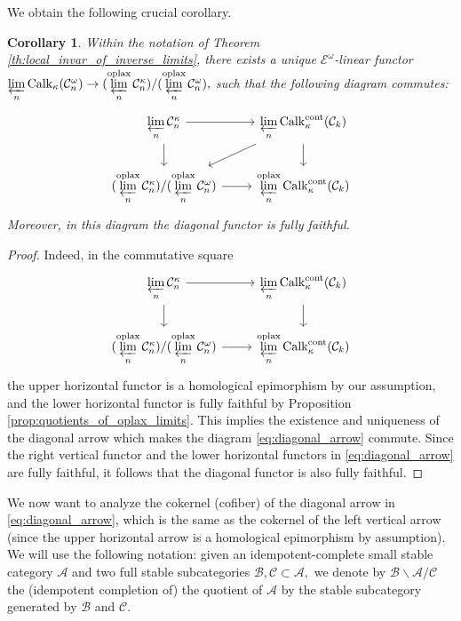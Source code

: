 \documentclass[11pt,leqno]{amsart}
\newtheorem{cor}[theo]{Corollary}
\numberwithin{equation}{section}
\newcommand{\prolim}[1][]{\mathop{\varprojlim}\limits_{#1}}
\newcommand{\oplax}{\operatorname{oplax}}
\newcommand{\cont}{\operatorname{cont}}
\newcommand{\cA}{{\mathcal A}}
\newcommand{\cB}{{\mathcal B}}
\newcommand{\cC}{{\mathcal C}}
\newcommand{\cE}{{\mathcal E}}
\newcommand{\Calk}{\operatorname{Calk}}
\begin{document}
We obtain the following crucial corollary.

\begin{cor}\label{cor:diagonal_arrow}
Within the notation of Theorem \ref{th:local_invar_of_inverse_limits}, there exists a unique $\cE^{\omega}$-linear functor $\prolim[n]\Calk_{\kappa}(\cC_n^{\omega})\to (\prolim[n]^{\oplax}\cC_n^{\kappa})/(\prolim[n]^{\oplax}\cC_n^{\omega}),$ such that the following diagram commutes:
\begin{equation}\label{eq:diagonal_arrow}
\begin{tikzcd}
\prolim[n]\cC_n^{\kappa} \ar[r]\ar[d]  & \prolim[n]\Calk_{\kappa}^{\cont}(\cC_k) \ar[d]\ar[ld] \\
(\prolim[n]^{\oplax}\cC_n^{\kappa})/(\prolim[n]^{\oplax}\cC_n^{\omega})\ar[r] & \prolim[n]^{\oplax}\Calk_{\kappa}^{\cont}(\cC_k)
\end{tikzcd}
\end{equation}
Moreover, in this diagram the diagonal functor is fully faithful.
\end{cor}

\begin{proof}
Indeed, in the commutative square
\begin{equation*}
\begin{tikzcd}
	\prolim[n]\cC_n^{\kappa} \ar[r]\ar[d]  & \prolim[n]\Calk_{\kappa}^{\cont}(\cC_k) \ar[d]\\
	(\prolim[n]^{\oplax}\cC_n^{\kappa})/(\prolim[n]^{\oplax}\cC_n^{\omega})\ar[r] & \prolim[n]^{\oplax}\Calk_{\kappa}^{\cont}(\cC_k)
\end{tikzcd}
\end{equation*}
the upper horizontal functor is a homological epimorphism by our assumption, and the lower horizontal functor is fully faithful by Proposition \ref{prop:quotients_of_oplax_limits}. This implies the existence and uniqueness of the diagonal arrow which makes the diagram \eqref{eq:diagonal_arrow} commute. Since the right vertical functor and the lower horizontal functors in \eqref{eq:diagonal_arrow} are fully faithful, it follows that the diagonal functor is also fully faithful. 
\end{proof}

We now want to analyze the cokernel (cofiber) of the diagonal arrow in \eqref{eq:diagonal_arrow}, which is the same as the cokernel of the left vertical arrow (since the upper horizontal arrow is a homological epimorphism by assumption).
We will use the following notation: given an idempotent-complete small stable category $\cA$ and two full stable subcategories $\cB,\cC\subset\cA,$ we denote by $\cB\backslash\cA/\cC$ the (idempotent completion of) the quotient of $\cA$ by the stable subcategory generated by $\cB$ and $\cC.$
\end{document}
